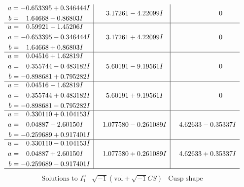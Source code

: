 \documentclass[1p]{elsarticle_modified}
\theoremstyle{definition}
\newcommand{\I}{\sqrt{-1}}
\begin{document}
$$\begin{array}{c|c|c}
\begin{aligned}
a &= -0.653395 + 0.346444 I \\
b &= \phantom{-}1.64668 - 0.86803 I\end{aligned}
 & \phantom{-}3.17261 - 4.22099 I & \phantom{-0.000000 } 0 \\ \hline\begin{aligned}
u &= \phantom{-}0.59921 - 1.45206 I \\
a &= -0.653395 - 0.346444 I \\
b &= \phantom{-}1.64668 + 0.86803 I\end{aligned}
 & \phantom{-}3.17261 + 4.22099 I & \phantom{-0.000000 } 0 \\ \hline\begin{aligned}
u &= \phantom{-}0.04516 + 1.62819 I \\
a &= \phantom{-}0.355744 - 0.483182 I \\
b &= -0.898681 + 0.795282 I\end{aligned}
 & \phantom{-}5.60191 - 9.19561 I & \phantom{-0.000000 } 0 \\ \hline\begin{aligned}
u &= \phantom{-}0.04516 - 1.62819 I \\
a &= \phantom{-}0.355744 + 0.483182 I \\
b &= -0.898681 - 0.795282 I\end{aligned}
 & \phantom{-}5.60191 + 9.19561 I & \phantom{-0.000000 } 0 \\ \hline\begin{aligned}
u &= \phantom{-}0.330110 + 0.104153 I \\
a &= \phantom{-}0.04887 - 2.60150 I \\
b &= -0.259689 + 0.917401 I\end{aligned}
 & \phantom{-}1.077580 - 0.261089 I & \phantom{-}4.62633 - 0.35337 I \\ \hline\begin{aligned}
u &= \phantom{-}0.330110 - 0.104153 I \\
a &= \phantom{-}0.04887 + 2.60150 I \\
b &= -0.259689 - 0.917401 I\end{aligned}
 & \phantom{-}1.077580 + 0.261089 I & \phantom{-}4.62633 + 0.35337 I\\
 \hline 
 \end{array}$$\newpage$$\begin{array}{c|c|c}  
\text{Solutions to }I^u_{1}& \I (\text{vol} + \sqrt{-1}CS) & \text{Cusp shape}\\
 \hline 
\begin{aligned}

\end{aligned}
\end{array}$$
\end{document}
